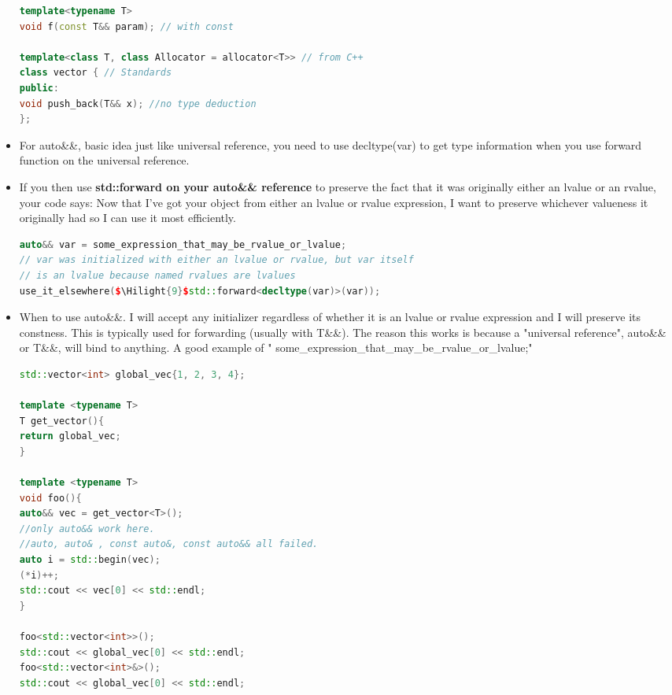 \documentclass[a4paper,12pt,twoside]{book}
\newcommand{\Hilight}[1]{\makebox[0pt][l]{\color{yellow}\rule[-3pt]{#1em}{11pt}}}
\begin{document}
\begin{itemize}
\begin{lstlisting}[frame=single, language=c++, mathescape=true]
template<typename T>
void f(const T&& param); // with const

template<class T, class Allocator = allocator<T>> // from C++
class vector { // Standards
public:
void push_back(T&& x); //no type deduction
};
\end{lstlisting}


\item For auto\&\&, basic idea just like universal reference, you need to use decltype(var) to get type information when you use forward function on the universal reference. 

\item If you then use \textbf{std::forward on your auto\&\& reference} to preserve the fact that it was originally either an lvalue or an rvalue, your code says: Now that I've got your object from either an lvalue or rvalue expression, I want to preserve whichever valueness it originally had so I can use it most efficiently.

\begin{lstlisting}[frame=single, language=c++]
auto&& var = some_expression_that_may_be_rvalue_or_lvalue;
// var was initialized with either an lvalue or rvalue, but var itself
// is an lvalue because named rvalues are lvalues
use_it_elsewhere($\Hilight{9}$std::forward<decltype(var)>(var));
\end{lstlisting}

\item When to use auto\&\&. I will accept any initializer regardless of whether it is an lvalue or rvalue expression and I will preserve its constness. This is typically used for forwarding (usually with T\&\&). The reason this works is because a "universal reference", auto\&\& or T\&\&, will bind to anything. A good example of "  some\_expression\_that\_may\_be\_rvalue\_or\_lvalue;"
\begin{lstlisting}[frame=single, language=c++]
std::vector<int> global_vec{1, 2, 3, 4};

template <typename T>
T get_vector(){
return global_vec;
}

template <typename T>
void foo(){
auto&& vec = get_vector<T>(); 
//only auto&& work here. 
//auto, auto& , const auto&, const auto&& all failed.
auto i = std::begin(vec);
(*i)++;
std::cout << vec[0] << std::endl;
}

foo<std::vector<int>>();
std::cout << global_vec[0] << std::endl;
foo<std::vector<int>&>();
std::cout << global_vec[0] << std::endl;

\end{lstlisting}

\end{itemize}
\end{document}
